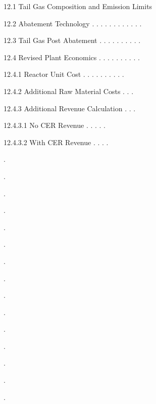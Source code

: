 \documentclass[a4paper,portrait,12pt]{article}
\begin{document}
\begin{flushleft}
12.1 Tail Gas Composition and Emission Limits
\end{flushleft}


\begin{flushleft}
12.2 Abatement Technology . . . . . . . . . . . .
\end{flushleft}


\begin{flushleft}
12.3 Tail Gas Post Abatement . . . . . . . . . .
\end{flushleft}


\begin{flushleft}
12.4 Revised Plant Economics . . . . . . . . . .
\end{flushleft}


\begin{flushleft}
12.4.1 Reactor Unit Cost . . . . . . . . . .
\end{flushleft}


\begin{flushleft}
12.4.2 Additional Raw Material Costs . . .
\end{flushleft}


\begin{flushleft}
12.4.3 Additional Revenue Calculation . . .
\end{flushleft}


\begin{flushleft}
12.4.3.1 No CER Revenue . . . . .
\end{flushleft}


\begin{flushleft}
12.4.3.2 With CER Revenue . . . .
\end{flushleft}





.


.


.


.


.


.


.


.


.





.


.


.


.


.


.
\end{document}
